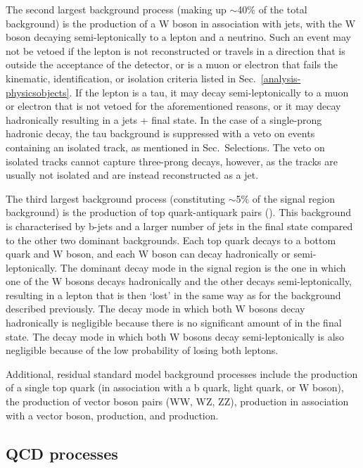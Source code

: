 The second largest background process (making up $\sim$40\% of the total 
background) is the production of a W boson in 
association with jets, with the W boson decaying semi-leptonically to a lepton 
and a neutrino. Such an event may not be vetoed if the lepton is not 
reconstructed or travels in a direction that is outside the acceptance of the 
detector, or is a muon or electron that fails the kinematic, identification, or 
isolation criteria listed in Sec.~\ref{analysis-physicsobjects}. If the lepton 
is a tau, it may decay semi-leptonically to a muon or electron that is not 
vetoed for the aforementioned reasons, or it may decay hadronically resulting 
in a jets + \met final state. In the case of a single-prong hadronic decay, the 
tau background is suppressed with a veto on events containing an isolated 
track, as mentioned in Sec.~Selections. The veto on isolated tracks cannot 
capture three-prong decays, however, as the tracks are usually not isolated and 
are instead reconstructed as a jet.

The third largest background process (constituting $\sim$5\% of the signal 
region background) is the production of top quark-antiquark pairs 
(\ttj). This background is characterised by b-jets and a larger number 
of jets in the final state compared to the other two dominant backgrounds.  
Each top quark decays to a bottom quark and W boson, and each W boson can decay 
hadronically or semi-leptonically. The dominant decay mode in the signal region 
is the one in which one of the W bosons decays hadronically and the other 
decays semi-leptonically, resulting in a lepton that is then `lost' in the same 
way as for the \wlj background described previously. The decay mode in which 
both W bosons decay hadronically is negligible because there is no significant 
amount of \met in the final state. The decay mode in which both W bosons decay 
semi-leptonically is also negligible because of the low probability of losing 
both leptons.

Additional, residual standard model background processes include the production 
of a single top quark (in association with a b quark, light quark, or W boson), 
the production of vector boson pairs (WW, WZ, ZZ), \ttbar production in 
association with a vector boson, \zllj production, and \gj production.

\subsection{QCD processes}

